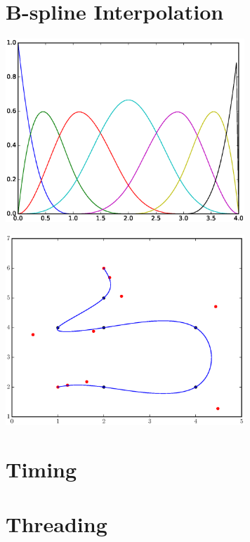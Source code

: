 \documentclass[10pt]{article}
\newenvironment{Figure}
  {\par\medskip\noindent\minipage{\linewidth}}
  {\endminipage\par\medskip}
\begin{document}
\begin{multicols}{2}
  \section*{B-spline Interpolation}
  \begin{Figure}
    \includegraphics[width=9cm]{../spline_basis.eps}
     \label{fig:basis}
  \end{Figure}
  \begin{Figure}
    \includegraphics[width=9cm]{../s_img/spline8.eps}
     \label{fig:sample}
  \end{Figure}

  \section*{Timing}

  \section*{Threading}


\end{multicols}
\end{document}
